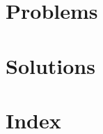 \documentclass[11pt,notitlepage]{scrreprt}
\subtitle{Problem proposals packet, with solutions}
\begin{document}


\chapter{Problems}


\chapter{Solutions}


\chapter*{Index}

\end{document}

